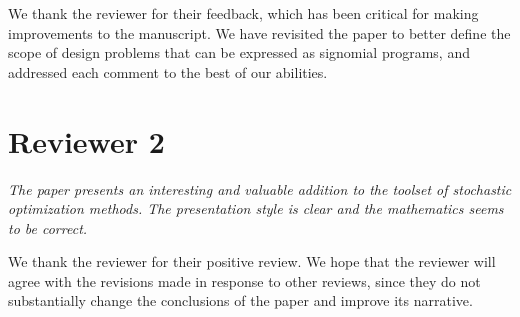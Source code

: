 \documentclass[11pt]{article}
\begin{document}
We thank the reviewer for their feedback, which has been critical for making improvements to the manuscript. We 
have revisited the paper to better define the scope of design problems that can be expressed as signomial 
programs, and addressed each comment to the best of our abilities. 

\section{Reviewer 2}

\textit{The paper presents an interesting and valuable addition to the toolset of stochastic optimization methods. 
The presentation style is clear and the mathematics seems to be correct.}

We thank the reviewer for their positive review. We hope that the reviewer
will agree with the revisions made in response to other reviews, since
they do not substantially change the conclusions of the paper
and improve its narrative. 
\end{document}
